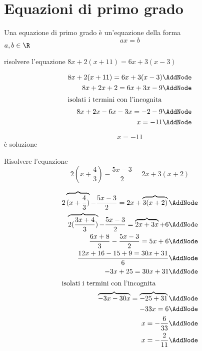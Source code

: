 \section{Equazioni di primo grado}
\label{sec:equazionidiprimogrado}
\begin{definizionet}{}{}
Una equazione di primo grado è un'equazione della forma \[ax=b\]
$a,b\in\R$
\end{definizionet}
\begin{esempiot}{}{}
risolvere l'equazione $8x+2(x+11) = 6x+3(x-3) $
\end{esempiot}
 \begin{NodesList}[margin=3cm]
  \begin{align*}
  8x+2(x+11) = 6x+3(x-3) \AddNode\\
  8x+2x+2  = 6x+3x-9 \AddNode\\
  \intertext{\hfil isolati i termini con l'incognita \hfil}
  8x+2x-6x-3x  = -2-9 \AddNode\\
    x  = -11 \AddNode
  \end{align*}
  \LinkNodes{ }
  \end{NodesList}
  \[x=-11\]
  è soluzione
\begin{esempiot}{}{}
Risolvere l'equazione \[2(x+\dfrac{4}{3})-\dfrac{5x-3}{2}=2x+3(x+2) \]
\end{esempiot}
 \begin{NodesList}[margin=3cm]
  \begin{align*}
  2\overbrace{(x+\dfrac{4}{3})}-\dfrac{5x-3}{2}=2x+\overbrace{3(x+2)} \AddNode\\
\overbrace{2(\dfrac{3x+4}{3})}-\dfrac{5x-3}{2}=\overbrace{2x+3x}+6 \AddNode\\
  \dfrac{6x+8}{3}-\dfrac{5x-3}{2}=5x+6   \AddNode\\
 \dfrac{12x+16-15+9=30x+31}{6}   \AddNode\\
 -3x+25=30x+31\AddNode\\
  \intertext{\hfil isolati i termini con l'incognita \hfil}
 \overbrace{-3x-30x}=\overbrace{-25+31}\AddNode\\
 -33x=6\AddNode\\
 x=-\dfrac{6}{33}\AddNode\\
 x=-\dfrac{2}{11}\AddNode\\
  \end{align*}
  \end{NodesList}

